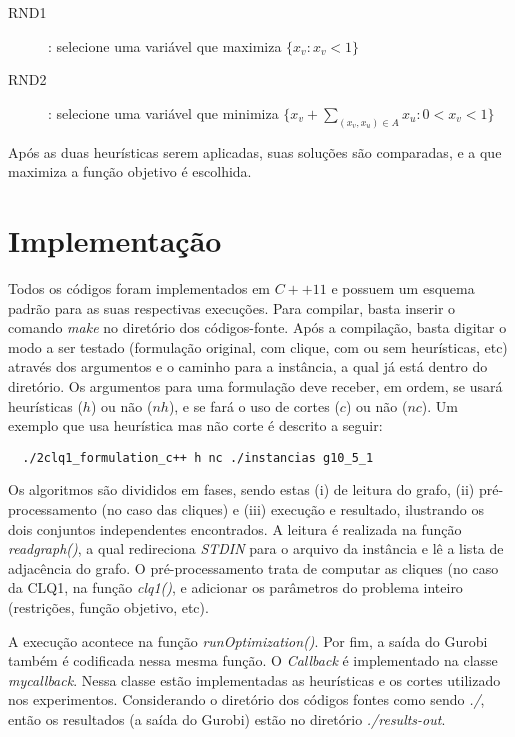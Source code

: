 \documentclass[12pt]{article}
\begin{document}
\begin{description}
\item[RND1]: selecione uma variável que maximiza $\{x_v : x_v < 1\}$
\item[RND2]: selecione uma variável que minimiza $\{x_v + \sum\limits_{(x_v, x_u) \in A}x_u : 0 < x_v < 1\}$
\end{description}

Após as duas heurísticas serem aplicadas, suas soluções são comparadas, e a que maximiza a função objetivo é escolhida.

\section{Implementação}

Todos os códigos foram implementados em $C++11$ e possuem um esquema padrão para as suas respectivas execuções. Para compilar, basta inserir o comando \textsl{make} no diretório dos códigos-fonte. Após a compilação, basta digitar o modo a ser testado (formulação original, com clique, com ou sem heurísticas, etc) através dos argumentos e o caminho para a instância, a qual já está dentro do diretório. Os argumentos para uma formulação deve receber, em ordem, se usará heurísticas ($h$) ou não ($nh$), e se fará o uso de cortes ($c$) ou não ($nc$). Um exemplo que usa heurística mas não corte é descrito a seguir:

\begin{verbatim}
  ./2clq1_formulation_c++ h nc ./instancias g10_5_1
\end{verbatim}

Os algoritmos são divididos em fases, sendo estas (i) de leitura do grafo, (ii) pré-processamento (no caso das cliques) e (iii) execução e resultado, ilustrando os dois conjuntos independentes encontrados. A leitura é realizada na função \textsl{readgraph()}, a qual redireciona \textsl{STDIN} para o arquivo da instância e lê a lista de adjacência do grafo. O pré-processamento trata de computar as cliques (no caso da CLQ1, na função \textsl{clq1()}, e adicionar os parâmetros do problema inteiro (restrições, função objetivo, etc).

A execução acontece na função \textsl{runOptimization()}. Por fim, a saída do Gurobi também é codificada nessa mesma função. O \textit{Callback} é implementado na classe \textsl{mycallback}. Nessa classe estão implementadas as heurísticas e os cortes utilizado nos experimentos. Considerando o diretório dos códigos fontes como sendo \textsl{./}, então os resultados (a saída do Gurobi) estão no diretório \textsl{./results-out}.
\end{document}
